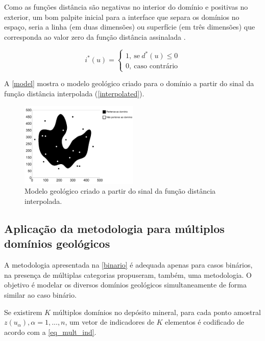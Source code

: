 Como as funções distância são negativas no interior do domínio e positivas no exterior, um bom palpite inicial para a interface que separa os domínios no espaço, seria a linha (em duas dimensões) ou superfície (em três dimensões) que corresponda ao valor zero da função distância assinalada \cite{wildedeutschcalibrate}. 

\begin{equation}
	i^*(u)=\begin{cases}
	1,\:\textrm{se}\:d^*(u)\leq0\\
	0,\:\textrm{caso contrário}\end{cases}
    \label{classifier}
\end{equation}

A \autoref{model} mostra o modelo geológico criado para o domínio a partir do sinal da função distância interpolada (\autoref{interpolated}).

\begin{figure}[!ht]
	\caption{\label{model}Modelo geológico criado a partir do sinal da função distância interpolada.}
	\begin{center}
		\includegraphics[width=0.5\textwidth]{modelagem_geologica/modelo}
	\end{center}
\end{figure}

\subsection{Aplicação da metodologia para múltiplos domínios geológicos}

A metodologia apresentada na \autoref{binario} é adequada apenas para casos binários, na presença de múltiplas categorias  propuseram, também, uma metodologia. O objetivo é modelar os diversos domínios geológicos simultaneamente de forma similar ao caso binário.

Se existirem $K$ múltiplos domínios no depósito mineral, para cada ponto amostral ${z(u_\alpha),\alpha=1,...,n}$, um vetor de indicadores de $K$ elementos é codificado de acordo com a \autoref{eq_mult_ind}.

